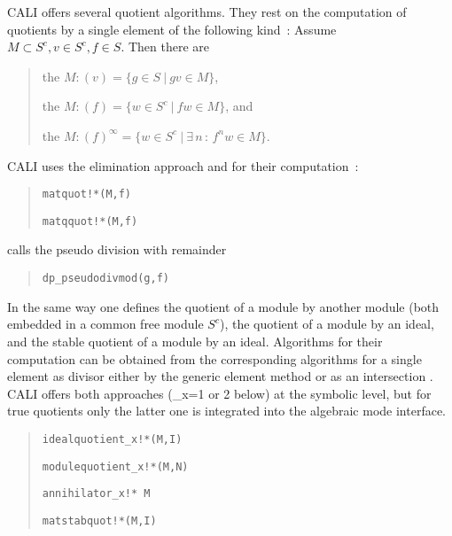 CALI offers several quotient algorithms. They rest on the computation
of quotients by a single element of the following kind~: Assume
$M\subset S^c, v\in S^c, f\in S$. Then there are
\begin{quote}
the  $M : (v) = \{g\in S\ |\ gv\in M\}$,

the  $M : (f) = \{w\in S^c\ |\ fw\in M\}$, and

the  $M : (f)^\infty = \{w\in S^c\ |\ \exists\,
n\, :\, f^nw\in M\}$.
\end{quote}
CALI uses the elimination approach \cite[4.4.]{CLO} and
\cite[6.38]{BKW} for their computation~:
\begin{quote}
\verb|matquot!*(M,f)|


\verb|matqquot!*(M,f)|

\end{quote}
 calls the pseudo division with remainder
\begin{quote}
\verb|dp_pseudodivmod(g,f)|

\end{quote}
\medskip

In the same way one defines the quotient of a module by another
module (both embedded in a common free module $S^c$), the quotient of
a module by an ideal, and the stable quotient of a module by an
ideal. Algorithms for their computation can be obtained from the
corresponding algorithms for a single element as divisor either by
the generic element method \cite{E} or as an intersection 
\cite[6.31]{BKW}. CALI offers both approaches (\_x=1 or 2 below) at
the symbolic level, but for true quotients only the latter one is 
integrated into the algebraic mode interface.
\begin{quote}
\verb|idealquotient_x!*(M,I)|


\verb|modulequotient_x!*(M,N)|


\verb|annihilator_x!* M|


\verb|matstabquot!*(M,I)|

\end{quote}


